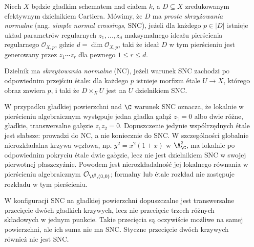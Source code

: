 \begin{definicja}
\label{def:ga5-snc}
Niech $X$ będzie gładkim schematem nad ciałem $k$, a
$D\subseteq X$ zredukowanym efektywnym dzielnikiem Cartiera.
Mówimy, że $D$ ma \emph{proste skrzyżowania normalne}
(ang. \emph{simple normal crossings}, SNC), jeżeli dla każdego
$p\in |D|$ istnieje układ parametrów regularnych
$z_1,\ldots,z_d$ maksymalnego ideału pierścienia
regularnego $\mathcal O_{X,p}$, gdzie
$d=\dim\mathcal O_{X,p}$, taki że ideał $D$ w tym
pierścieniu jest generowany przez $z_1\cdots z_r$
dla pewnego $1\le r\le d$.

Dzielnik ma \emph{skrzyżowania normalne} (NC), jeżeli
warunek SNC zachodzi po odpowiednim przejściu étale:
dla każdego $p$ istnieje morfizm étale $U\to X$,
którego obraz zawiera $p$, i taki że $D\times_XU$ jest
na $U$ dzielnikiem SNC.
\end{definicja}

W przypadku gładkiej powierzchni nad $\C$ warunek SNC
oznacza, że lokalnie w pierścieniu algebraicznym występuje
jedna gładka gałąź $z_1=0$ albo dwie różne, gładkie,
transwersalne gałęzie $z_1z_2=0$. Dopuszczenie jedynie
współrzędnych étale jest słabsze: prowadzi do NC, a nie
koniecznie do SNC. W szczególności globalnie nierozkładalna
krzywa węzłowa, np. $y^2=x^2(1+x)$ w $\A^2_{\C}$,
ma lokalnie po odpowiednim pokryciu étale dwie gałęzie,
lecz nie jest dzielnikiem SNC w swojej pierwotnej
płaszczyźnie. Powodem jest nierozkładalność jej lokalnego
równania w pierścieniu algebraicznym
$\mathcal O_{\A^2,(0,0)}$; formalny lub étale rozkład
nie zastępuje rozkładu w tym pierścieniu.

W konfiguracji SNC na gładkiej powierzchni dopuszczalne jest
transwersalne przecięcie dwóch gładkich krzywych, lecz nie
przecięcie trzech różnych składowych w jednym punkcie.
Takie przecięcia są oczywiście możliwe na samej powierzchni,
ale ich suma nie ma SNC. Styczne przecięcie dwóch krzywych
również nie jest SNC.

